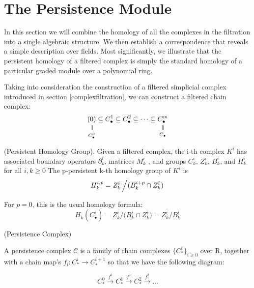 \documentclass[11pt,a4paper]{report}
\newcommand{\verteq}{\rotatebox{90}{$\,=$}}
\newcommand{\equalto}[2]{\underset{\scriptstyle\overset{\mkern4mu\verteq}{#2}}{#1}}
\begin{document}
              \section{The Persistence Module}

              In this section we will combine the homology of all the complexes in the filtration
            into a single algebraic structure. We then establish a correspondence that reveals a simple
            description over fields. Most significantly, we illustrate that the persistent homology of
            a filtered complex is simply the standard homology of a particular graded module over
            a polynomial ring.

              Taking into consideration the construction of a filtered simplicial complex introduced in section \ref{complexfiltration}, we can construct a filtered chain complex: \\
              \[
                    \equalto{(0)}{C_\bullet^0} \subseteq C_\bullet^1 \subseteq C_\bullet^2 \subseteq \cdots \subseteq \equalto{C_\bullet^m}{C_\bullet}
              \]

              \begin{defn} (Persistent Homology Group). Given a filtered complex, the i-th complex $K^i$ has associated boundary operators
                $\partial^i_k$, matrices $M^i_k$ , and groups $C^i_k$, $Z^i_k$, $B^i_k$, and $H^i_k$ for all $i, k \geq 0$
                The p-persistent k-th homology group of $K^i$ is
                        \[
                        H_k^{i, p} = Z_k^i \left/ (B_k^{i+p} \cap Z_k^i) \right.
            \]
            \end{defn}

              For $p = 0$, this is the usual homology formula:
               \[ H_k(C_\bullet^i) = Z_k^i / {(B_k^i \cap Z_k^i}) = Z_k^i / B_k^i \]
             \begin{defn} (Persistence Complex)

             A persistence complex $\mathcal{C}$ is a family of chain complexes $\{C_*^i\}_{i \geq 0}$ over R, together with a chain map's $f_i: C_*^i \rightarrow C_*^{i+1}$ so that we have the following diagram:

             \[
               C_*^0 \xrightarrow{f^0} C_*^1 \xrightarrow{f^1} C_*^2 \xrightarrow{f^2} \dots
             \]


             \end{defn}
\end{document}

